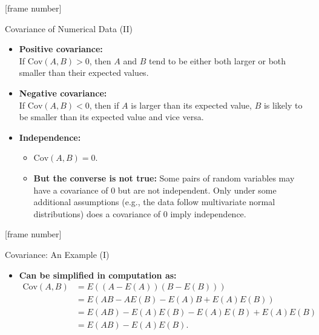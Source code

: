 \documentclass[aspectratio=169,t]{beamer}
\begin{document}
  {
    [frame number]
    \begin{frame}{Covariance of Numerical Data (II)}
    \begin{itemize}
      \item \textbf{Positive covariance:}\\
            If $\text{Cov}(A,B) > 0$, then $A$ and $B$ tend to be either both larger or both smaller than their expected values.
      \item \textbf{Negative covariance:}\\
            If $\text{Cov}(A,B) < 0$, then if $A$ is larger than its expected value, $B$ is likely to be smaller than its expected value and vice versa.
      \item \textbf{Independence:}
      \begin{itemize}
        \item $\text{Cov}(A,B) = 0$.
        \item \textbf{\color{airforceblue}But the converse is not true:} Some pairs of random variables may have a covariance of $0$ but are not independent. Only under some additional assumptions (e.g., the data follow multivariate normal distributions) does a covariance of $0$ imply independence.
      \end{itemize}
    \end{itemize}
    \end{frame}
  }

  {
    [frame number]
    \begin{frame}{Covariance: An Example (I)}
    \begin{itemize}
      \item \textbf{Can be simplified in computation as:}
            \begin{align}
              \text{Cov}(A,B) &= E((A - E(A))(B-E(B)))\\
                              &= E(AB-AE(B)-E(A)B+E(A)E(B))\\
                              &= E(AB)-E(A)E(B)-E(A)E(B)+E(A)E(B)\\
                              &= E(AB)-E(A)E(B).
            \end{align}
    \end{itemize}
    \end{frame}
  }
\end{document}
